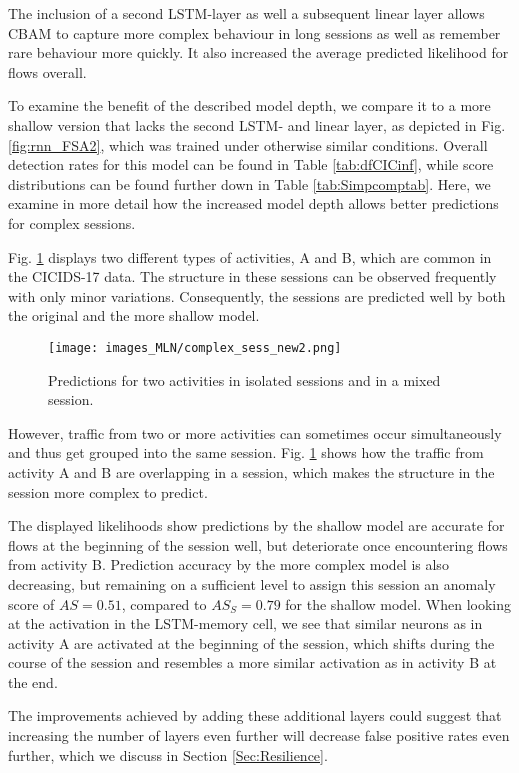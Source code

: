 The inclusion of a second LSTM-layer as well a subsequent linear layer allows CBAM to capture more complex behaviour in long sessions as well as remember rare behaviour more quickly. It also increased the average predicted likelihood for flows overall. 

To examine the benefit of the described model depth, we compare it to a more shallow version that lacks the second LSTM- and linear layer, as depicted in Fig. \ref{fig:rnn_FSA2}, which was trained under otherwise similar conditions. Overall detection rates for this model can be found in Table \ref{tab:dfCICinf}, while score distributions can be found  further down in Table \ref{tab:Simpcomptab}. Here, we examine in more detail how the increased model depth allows better predictions for complex sessions. 

Fig. \ref{fig:complex_sess} displays two different types of activities, A and B, which are common in the CICIDS-17 data. The structure in these sessions can be observed frequently with only minor variations. Consequently, the sessions are predicted well by both the original and the more shallow model.
\begin{figure}[!ht]
\centering
\texttt{[image: images\_MLN/complex\_sess\_new2.png]} \caption{Predictions for two activities in isolated sessions and in a mixed session.}\label{fig:complex_sess}
\end{figure}

However, traffic from two or more activities can sometimes occur simultaneously and thus get grouped into the same session. Fig. \ref{fig:complex_sess} shows how the traffic from activity A and B are overlapping in a session, which makes the structure in the session more complex to predict.



The displayed likelihoods show predictions by the shallow model are accurate for flows at the beginning of the session well, but deteriorate once encountering flows from activity B. Prediction accuracy by the more complex model is also decreasing, but remaining on a sufficient level to assign this session an anomaly score of $AS=0.51$, compared to $AS_S=0.79$ for the shallow model. When looking at the activation in the LSTM-memory cell, we see that similar neurons as in activity A are activated at the beginning of the session, which shifts during the course of the session and resembles a more similar activation as in activity B at the end.

The improvements achieved by adding these additional layers could suggest that increasing the number of layers even further will decrease false positive rates even further, which we discuss in Section \ref{Sec:Resilience}.

